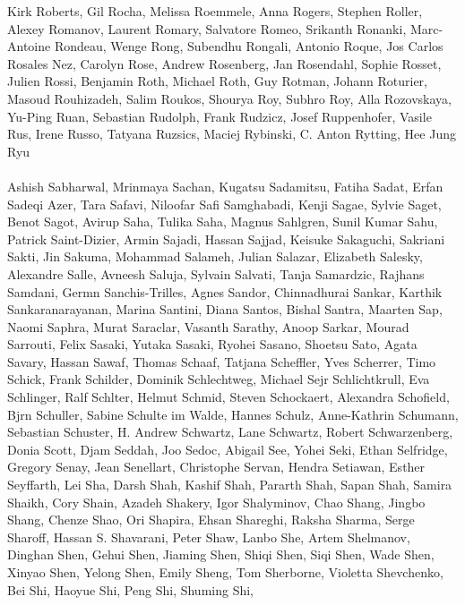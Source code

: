 \documentclass[11pt]{article}
\begin{document}
\begin{description}[itemsep=4mm, style=nextline]
Kirk Roberts, 
Gil Rocha, 
Melissa Roemmele, 
Anna Rogers, 
Stephen Roller, 
Alexey Romanov, 
Laurent Romary, 
Salvatore Romeo, 
Srikanth Ronanki, 
Marc-Antoine Rondeau, 
Wenge Rong, 
Subendhu Rongali, 
Antonio Roque, 
Jos Carlos Rosales Nez, 
Carolyn Rose, 
Andrew Rosenberg, 
Jan Rosendahl, 
Sophie Rosset, 
Julien Rossi, 
Benjamin Roth, 
Michael Roth, 
Guy Rotman, 
Johann Roturier, 
Masoud Rouhizadeh, 
Salim Roukos, 
Shourya Roy, 
Subhro Roy, 
Alla Rozovskaya, 
Yu-Ping Ruan, 
Sebastian Rudolph, 
Frank Rudzicz, 
Josef Ruppenhofer, 
Vasile Rus, 
Irene Russo, 
Tatyana Ruzsics, 
Maciej Rybinski, 
C. Anton Rytting, 
Hee Jung Ryu
\\
\\
Ashish Sabharwal, 
Mrinmaya Sachan, 
Kugatsu Sadamitsu, 
Fatiha Sadat, 
Erfan Sadeqi Azer, 
Tara Safavi, 
Niloofar Safi Samghabadi, 
Kenji Sagae, 
Sylvie Saget, 
Benot Sagot, 
Avirup Saha, 
Tulika Saha, 
Magnus Sahlgren, 
Sunil Kumar Sahu, 
Patrick Saint-Dizier, 
Armin Sajadi, 
Hassan Sajjad, 
Keisuke Sakaguchi, 
Sakriani Sakti, 
Jin Sakuma, 
Mohammad Salameh, 
Julian Salazar, 
Elizabeth Salesky, 
Alexandre Salle, 
Avneesh Saluja, 
Sylvain Salvati, 
Tanja Samardzic, 
Rajhans Samdani, 
Germn Sanchis-Trilles, 
Agnes Sandor, 
Chinnadhurai Sankar, 
Karthik Sankaranarayanan, 
Marina Santini, 
Diana Santos, 
Bishal Santra, 
Maarten Sap, 
Naomi Saphra, 
Murat Saraclar, 
Vasanth Sarathy, 
Anoop Sarkar, 
Mourad Sarrouti, 
Felix Sasaki, 
Yutaka Sasaki, 
Ryohei Sasano, 
Shoetsu Sato, 
Agata Savary, 
Hassan Sawaf, 
Thomas Schaaf, 
Tatjana Scheffler, 
Yves Scherrer, 
Timo Schick, 
Frank Schilder, 
Dominik Schlechtweg, 
Michael Sejr Schlichtkrull, 
Eva Schlinger, 
Ralf Schlter, 
Helmut Schmid, 
Steven Schockaert, 
Alexandra Schofield, 
Bjrn Schuller, 
Sabine Schulte im Walde, 
Hannes Schulz, 
Anne-Kathrin Schumann, 
Sebastian Schuster, 
H. Andrew Schwartz, 
Lane Schwartz, 
Robert Schwarzenberg, 
Donia Scott, 
Djam Seddah, 
Joo Sedoc, 
Abigail See, 
Yohei Seki, 
Ethan Selfridge, 
Gregory Senay, 
Jean Senellart, 
Christophe Servan, 
Hendra Setiawan, 
Esther Seyffarth, 
Lei Sha, 
Darsh Shah, 
Kashif Shah, 
Pararth Shah, 
Sapan Shah, 
Samira Shaikh, 
Cory Shain, 
Azadeh Shakery, 
Igor Shalyminov, 
Chao Shang, 
Jingbo Shang, 
Chenze Shao, 
Ori Shapira, 
Ehsan Shareghi, 
Raksha Sharma, 
Serge Sharoff, 
Hassan S. Shavarani, 
Peter Shaw, 
Lanbo She, 
Artem Shelmanov, 
Dinghan Shen, 
Gehui Shen, 
Jiaming Shen, 
Shiqi Shen, 
Siqi Shen, 
Wade Shen, 
Xinyao Shen, 
Yelong Shen, 
Emily Sheng, 
Tom Sherborne, 
Violetta Shevchenko, 
Bei Shi, 
Haoyue Shi, 
Peng Shi, 
Shuming Shi, 

\end{description}
\end{document}
